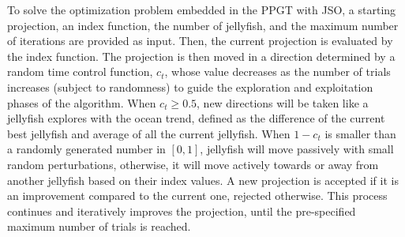 \documentclass[
  12pt,
]{interact}
\theoremstyle{plain}
\begin{document}
To solve the optimization problem embedded in the PPGT with JSO, a
starting projection, an index function, the number of jellyfish, and the
maximum number of iterations are provided as input. Then, the current
projection is evaluated by the index function. The projection is then
moved in a direction determined by a random time control function,
\(c_t\), whose value decreases as the number of trials increases
(subject to randomness) to guide the exploration and exploitation phases
of the algorithm. When \(c_t \ge 0.5\), new directions will be taken
like a jellyfish explores with the ocean trend, defined as the
difference of the current best jellyfish and average of all the current
jellyfish. When \(1- c_t\) is smaller than a randomly generated number
in \([0, 1]\), jellyfish will move passively with small random
perturbations, otherwise, it will move actively towards or away from
another jellyfish based on their index values. A new projection is
accepted if it is an improvement compared to the current one, rejected
otherwise. This process continues and iteratively improves the
projection, until the pre-specified maximum number of trials is reached.
\end{document}
